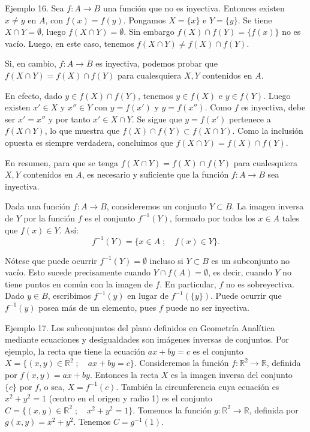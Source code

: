 \documentclass[12pt,oneside]{book}
\begin{document}
Ejemplo 16. Sea \(f: A \to B\) una función que no es inyectiva. Entonces existen \(x \neq y\) en \(A\), con \(f(x) = f(y)\). Pongamos \(X = \{x\}\) e \(Y = \{y\}\). Se tiene \(X \cap Y = \emptyset\), luego \(f(X \cap Y) = \emptyset\). Sin embargo \(f(X) \cap f(Y) = \{f(x)\}\) no es vacío. Luego, en este caso, tenemos \(f(X \cap Y) \neq f(X) \cap f(Y)\).

Si, en cambio, \(f: A \to B\) es inyectiva, podemos probar que \(f(X \cap Y) = f(X) \cap f(Y)\) para cualesquiera \(X, Y\) contenidos en \(A\).

En efecto, dado \(y \in f(X) \cap f(Y)\), tenemos \(y \in f(X)\) e \(y \in f(Y)\). Luego existen \(x' \in X\) y \(x'' \in Y\) con \(y = f(x')\) y \(y = f(x'')\). Como \(f\) es inyectiva, debe ser \(x' = x''\) y por tanto \(x' \in X \cap Y\). Se sigue que \(y = f(x')\) pertenece a \(f(X \cap Y)\), lo que muestra que \(f(X) \cap f(Y) \subset f(X \cap Y)\). Como la inclusión opuesta es siempre verdadera, concluimos que \(f(X \cap Y) = f(X) \cap f(Y)\).

En resumen, para que se tenga \(f(X \cap Y) = f(X) \cap f(Y)\) para cualesquiera \(X, Y\) contenidos en \(A\), es necesario y suficiente que la función \(f: A \to B\) sea inyectiva.

Dada una función \(f: A \to B\), consideremos un conjunto \(Y \subset B\). La imagen inversa de \(Y\) por la función \(f\) es el conjunto \(f^{-1}(Y)\), formado por todos los \(x \in A\) tales que \(f(x) \in Y\). Así:
\[
f^{-1}(Y) = \{x \in A \; ; \quad f(x) \in Y\}.
\]

Nótese que puede ocurrir \(f^{-1}(Y) = \emptyset\) incluso si \(Y \subset B\) es un subconjunto no vacío. Esto sucede precisamente cuando \(Y \cap f(A) = \emptyset\), es decir, cuando \(Y\) no tiene puntos en común con la imagen de \(f\). En particular, \(f\) no es sobreyectiva. Dado \(y \in B\), escribimos \(f^{-1}(y)\) en lugar de \(f^{-1}(\{y\})\). Puede ocurrir que \(f^{-1}(y)\) posea más de un elemento, pues \(f\) puede no ser inyectiva.

Ejemplo 17. Los subconjuntos del plano definidos en Geometría Analítica mediante ecuaciones y desigualdades son imágenes inversas de conjuntos. Por ejemplo, la recta que tiene la ecuación \(ax + by = c\) es el conjunto \(X = \{(x, y) \in \mathbb{R}^2 \; ; \quad ax + by = c\}\). Consideremos la función \(f: \mathbb{R}^2 \to \mathbb{R}\), definida por \(f(x, y) = ax + by\). Entonces la recta \(X\) es la imagen inversa del conjunto \(\{c\}\) por \(f\), o sea, \(X = f^{-1}(c)\). También la circunferencia cuya ecuación es \(x^2 + y^2 = 1\) (centro en el origen y radio 1) es el conjunto \(C = \{(x, y) \in \mathbb{R}^2 \; ; \quad x^2 + y^2 = 1\}\). Tomemos la función \(g: \mathbb{R}^2 \to \mathbb{R}\), definida por \(g(x, y) = x^2 + y^2\). Tenemos \(C = g^{-1}(1)\).
\end{document}

